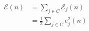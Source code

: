 \begin{equation}
\label{eq:totalinsterrorenergy}
\begin{align*}
\mathscr{E}(n) & = \sum_{j \in C}{\mathscr{E}_j(n)} \\
			   & = \frac{1}{2} \sum_{j \in C}{\mathit{e}_j^2(n)}
\end{align*}
\end{equation}
